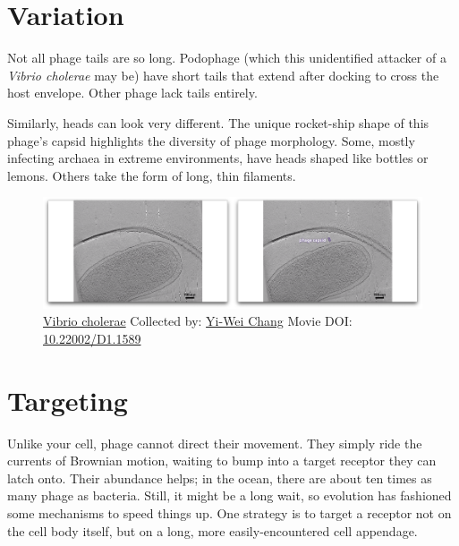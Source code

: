 \documentclass[]{tufte-book}
\begin{document}
\section{Variation}\label{variation}

Not all phage tails are so long. Podophage (which this unidentified
attacker of a \emph{Vibrio cholerae} may be) have short tails that
extend after docking to cross the host envelope. Other phage lack tails
entirely.

Similarly, heads can look very different. The unique rocket-ship shape
of this phage's capsid highlights the diversity of phage morphology.
Some, mostly infecting archaea in extreme environments, have heads
shaped like bottles or lemons. Others take the form of long, thin
filaments.





\begin{figure}
\includegraphics{movie_stills/10_4} \caption[\protect\hyperlink{tree}{Vibrio cholerae} Collected by:
\protect\hyperlink{yi-wei_chang}{Yi-Wei Chang} Movie DOI:
\href{https://doi.org/10.22002/D1.1589}{10.22002/D1.1589}]{\protect\hyperlink{tree}{Vibrio cholerae} Collected by:
\protect\hyperlink{yi-wei_chang}{Yi-Wei Chang} Movie DOI:
\href{https://doi.org/10.22002/D1.1589}{10.22002/D1.1589}}\label{fig:10-4}
\end{figure}

\section{Targeting}\label{targeting}

Unlike your cell, phage cannot direct their movement. They simply ride
the currents of Brownian motion, waiting to bump into a target receptor
they can latch onto. Their abundance helps; in the ocean, there are
about ten times as many phage as bacteria. Still, it might be a long
wait, so evolution has fashioned some mechanisms to speed things up. One
strategy is to target a receptor not on the cell body itself, but on a
long, more easily-encountered cell appendage.
\end{document}
